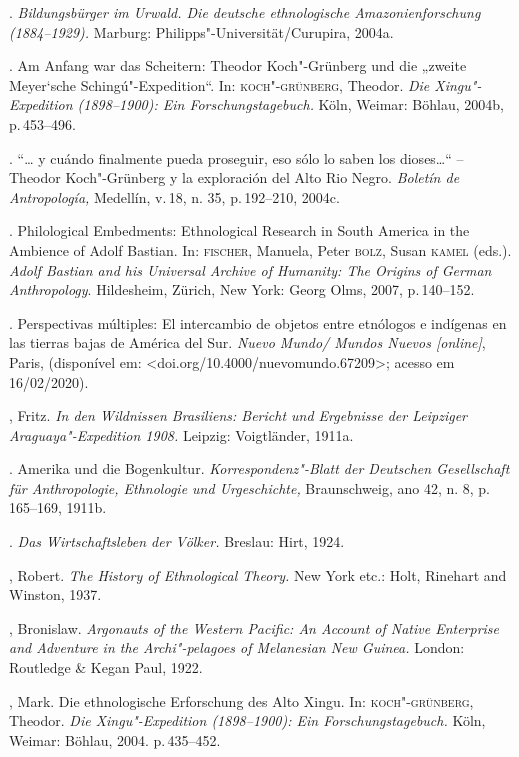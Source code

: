 \begin{bibliohedra}
 \titidem. \textit{Bildungsbürger im Urwald. Die deutsche
 ethnologische Amazonienforschung (1884--1929).} Marburg:
 Philipps"-Universität/Curupira, 2004a.

 \titidem. Am Anfang war das Scheitern: Theodor Koch"-Grünberg
 und die „zweite Meyer`sche Schingú"-Expedition``. In: \textsc{koch"-grünberg},
 Theodor. \textit{Die Xingu"-Expedition (1898--1900): Ein
 Forschungstagebuch.} Köln, Weimar: Böhlau, 2004b, p.\,453--496.

 \titidem. ``\ldots{} y cuándo finalmente pueda proseguir, eso
 sólo lo saben los dioses\ldots{}`` -- Theodor Koch"-Grünberg y la
 exploración del Alto Rio Negro. \textit{Boletín de Antropología,}
 Medellín, v.\,18, n. 35, p.\,192--210, 2004c.

 \titidem. Philological Embedments: Ethnological Research in
 South America in the Ambience of Adolf Bastian. In: \textsc{fischer}, Manuela,
 Peter \textsc{bolz}, Susan \textsc{kamel} (eds.). \textit{Adolf Bastian and his Universal
 Archive of Humanity: The Origins of German Anthropology}. Hildesheim,
 Zürich, New York: Georg Olms, 2007, p.\,140--152.

 \titidem. Perspectivas múltiples: El intercambio de objetos
 entre etnólogos e indígenas en las tierras bajas de América del Sur.
 \textit{Nuevo Mundo/ Mundos Nuevos {[}online{]}}, Paris, (disponível
 em: \textless{}doi.org/10.4000/nuevomundo.67209\textgreater{}; acesso em
 16/02/2020).

 , Fritz. \textit{In den Wildnissen Brasiliens: Bericht und
 Ergebnisse der Leipziger Araguaya"-Expedition 1908.} Leipzig:
 Voigtländer, 1911a.

 \titidem. Amerika und die Bogenkultur.
 \textit{Korrespondenz"-Blatt der Deutschen Gesellschaft für
 Anthropologie, Ethnologie und Urgeschichte,} Braunschweig, ano 42, n.
 8, p.\,165--169, 1911b.

 \titidem. \textit{Das Wirtschaftsleben der Völker.} Breslau:
 Hirt, 1924.

 , Robert. \textit{The History of Ethnological Theory.} New York
 etc.: Holt, Rinehart and Winston, 1937.

 , Bronislaw. \textit{Argonauts of the Western Pacific: An
 Account of Native Enterprise and Adventure in the Archi"-pelagoes of
 Melanesian New Guinea.} London: Routledge \& Kegan Paul, 1922.

 , Mark. Die ethnologische Erforschung des Alto Xingu. In:
 \textsc{koch"-grünberg}, Theodor. \textit{Die Xingu"-Expedition (1898--1900): Ein
 Forschungstagebuch.} Köln, Weimar: Böhlau, 2004. p.\,435--452.


\end{bibliohedra}
